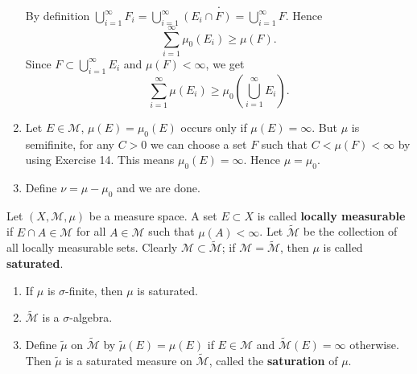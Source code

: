 \begin{sol}
\begin{enumerate}
\[      .\]
      By definition $\bigcup_{i=1} ^{\infty}F_i=\bigcup_{i=1} ^{\infty}\left( E_i\cap F  \right) =\bigcup_{i=1} ^{\infty}F$. Hence 
      \[
      \sum_{i=1}^{\infty}\mu_0\left( E_i \right) \ge \mu\left( F \right) 
      .\]
      Since $ F\subset \bigcup_{i=1} ^{\infty}E_i$ and $\mu\left( F \right)<\infty $, we get
      \[
      \sum_{i=1}^{\infty}\mu\left( E_i \right) \ge \mu_0\left( \bigcup_{i=1} ^{\infty}E_i \right) 
      .\]
    \item Let $E\in \mathcal{M}$, $\mu\left( E \right) =\mu_0\left( E \right) $ occurs only if $\mu\left( E \right)=\infty $. But $\mu$ is semifinite, for any $C>0$ we can choose a set $F$ such that $C<\mu\left( F \right)<\infty $ by using Exercise 14. This means $\mu_0\left( E \right)=\infty $. Hence $\mu=\mu_0$.
    \item Define $\nu=\mu-\mu_0$ and we are done.
  \end{enumerate}

\end{sol}

\begin{exe}
  Let $\left( X,\mathcal{M},\mu \right) $ be a measure space. A set $E\subset X$ is called \textbf{locally measurable} if $E\cap A\in \mathcal{M}$ for all $A\in \mathcal{M}$ such that $\mu\left( A \right) <\infty$. Let $\tilde{\mathcal{M}}$ be the collection of all locally measurable sets. Clearly $\mathcal{M}\subset \tilde{\mathcal{M}}$; if $\mathcal{M}=\tilde{\mathcal{M}}$, then $\mu$ is called \textbf{saturated}.
  \begin{enumerate}
    \item If $\mu$ is $\sigma$-finite, then $\mu$ is saturated.
    \item $\tilde{\mathcal{M}}$ is a $\sigma$-algebra.
    \item Define $\tilde{\mu}$ on $\tilde{\mathcal{M}}$ by $\tilde{\mu}\left( E \right) =\mu\left( E \right) $ if $E\in \mathcal{M}$ and $\tilde{\mathcal{M}}\left( E \right) =\infty$ otherwise. Then $\tilde{\mu}$ is a saturated measure on  $\tilde{\mathcal{M}}$, called the \textbf{saturation} of $\mu$.
  \end{enumerate}
\end{exe}
